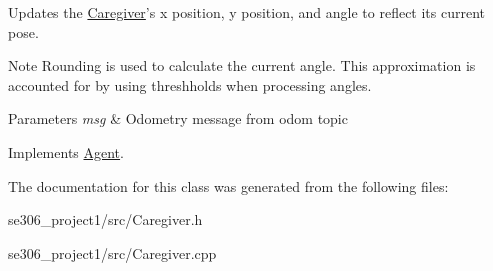 Updates the \hyperlink{classCaregiver}{Caregiver}'s x position, y position, and angle to reflect its current pose. 

\begin{DoxyNote}{Note}
Rounding is used to calculate the current angle. This approximation is accounted for by using threshholds when processing angles. 
\end{DoxyNote}

\begin{DoxyParams}{Parameters}
{\em msg} & Odometry message from odom topic \\
\hline
\end{DoxyParams}


Implements \hyperlink{classAgent}{Agent}.



The documentation for this class was generated from the following files\-:\begin{DoxyCompactItemize}
\item 
se306\-\_\-project1/src/Caregiver.\-h\item 
se306\-\_\-project1/src/Caregiver.\-cpp\end{DoxyCompactItemize}
